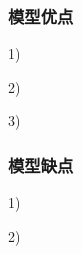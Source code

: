 \documentclass[nocover]{cumcmart}%
\begin{document}
\subsubsection{模型优点}
1)	

2)	

3)	

\subsubsection{模型缺点}
1)	

2)	





\end{document}
